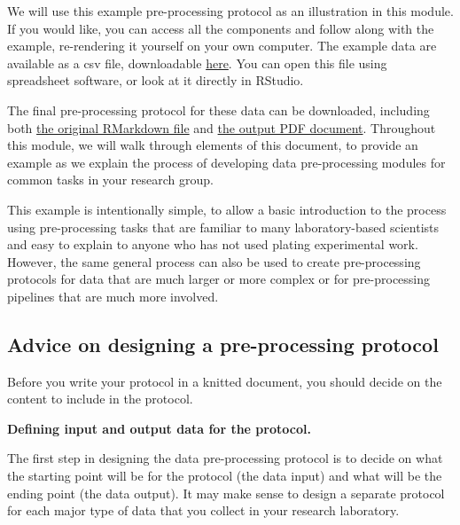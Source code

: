 \documentclass[]{tufte-book}
\begin{document}
We will use this example pre-processing protocol as an illustration in this
module. If you would like, you can access all the components and follow along
with the example, re-rendering it yourself on your own computer. The example
data are available as a csv file, downloadable
\href{https://raw.githubusercontent.com/geanders/improve_repro/master/data/bactcountr_example_data/cfu_data.csv}{here}.
You can open this file using spreadsheet software, or look at it directly in
RStudio.

The final pre-processing protocol for these data can be downloaded, including
both \href{https://raw.githubusercontent.com/geanders/improve_repro/master/data/bactcountr_example_data/example_protocol.Rmd}{the original RMarkdown
file}
and \href{https://github.com/geanders/improve_repro/raw/master/data/bactcountr_example_data/example_protocol.pdf}{the output PDF
document}.
Throughout this module, we will walk through elements of this document, to
provide an example as we explain the process of developing data pre-processing
modules for common tasks in your research group.

This example is intentionally simple, to allow a basic introduction to the
process using pre-processing tasks that are familiar to many laboratory-based
scientists and easy to explain to anyone who has not used plating experimental
work. However, the same general process can also be used to create
pre-processing protocols for data that are much larger or more complex or for
pre-processing pipelines that are much more involved.

\hypertarget{advice-on-designing-a-pre-processing-protocol}{%
\subsection{Advice on designing a pre-processing protocol}\label{advice-on-designing-a-pre-processing-protocol}}

Before you write your protocol in a knitted document, you should decide on the
content to include in the protocol.

\textbf{Defining input and output data for the protocol.}

The first step in designing the data pre-processing protocol is to decide on what
the starting point will be for the protocol (the data input) and what will be
the ending point (the data output). It may make sense to design a separate
protocol for each major type of data that you collect in your research
laboratory.
\end{document}
